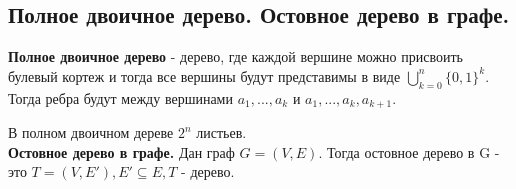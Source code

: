 \subsection{Полное двоичное дерево. Остовное дерево в графе.}
\textbf{Полное двоичное дерево} - дерево, где каждой вершине можно присвоить булевый кортеж и тогда все вершины
будут представимы в виде $\bigcup\limits_{k = 0}^{n} \{0, 1\}^{k}$. Тогда ребра будут между вершинами $a_1, ..., a_k$ и
$a_1, ..., a_k, a_{k + 1}$.

В полном двоичном дереве $2^n$ листьев.\\


\textbf{Остовное дерево в графе.} Дан граф $G = (V, E)$. Тогда остовное дерево в G - это $T = (V, E'), E' \subseteq E, T$ - дерево.